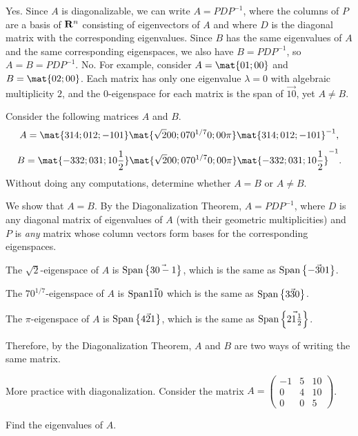 \begin{problems}
\begin{solution}
  \begin{subproblems}
    \subproblem Yes.  Since $A$ is diagonalizable, we can write
    $A = PDP^{-1}$, where the columns of $P$ are a basis of
    ${\bf R}^n$ consisting of eigenvectors of $A$ and where $D$ is the
    diagonal matrix with the corresponding eigenvalues.  Since $B$ has
    the same eigenvalues of $A$ and the same corresponding
    eigenspaces, we also have $B = PDP^{-1}$, so $A = B = PDP^{-1}$.
    \subproblem No.  For example, consider $A= \mat{0 1; 0 0}$ and
    $B = \mat{0 2; 0 0}$.  Each matrix has only one eigenvalue
    $\lambda = 0$ with algebraic multiplicity $2$, and the
    $0$-eigenspace for each matrix is the span of $\vec{1 0}$, yet
    $A \neq B$.
  \end{subproblems}
\end{solution}


\problem Consider the following matrices $A$ and $B$.
\[A = \mat{3 1 4; 0 1 2; -1 0 1} \mat{\sqrt{2} 0 0; 0 70^{1/7} 0; 0 0
    \pi} \mat{3 1 4; 0 1 2; -1 0 1}^{-1},\]
\[B = \mat{-3 3 2; 0 3 1; 1 0 \frac{1}{2}} \mat{\sqrt{2} 0 0; 0
    70^{1/7} 0; 0 0 \pi} \mat{-3 3 2; 0 3 1; 1 0 \frac{1}{2}}^{-1}.\]
Without doing any computations, determine whether $A = B$ or
$A \neq B$.

\begin{solution}
  We show that $A=B$.  By the Diagonalization Theorem, $A = PDP^{-1}$,
  where $D$ is any diagonal matrix of eigenvalues of $A$ (with their
  geometric multiplicities) and $P$ is \textit{any} matrix whose
  column vectors form bases for the corresponding eigenspaces.

  The $\sqrt{2}$-eigenspace of $A$ is
  $\textup{Span}\left\{\vec{3 0 -1}\right\}$, which is the same as
  $\textup{Span}\left\{\vec{-3 0 1}\right\}$.

  The $70^{1/7}$-eigenspace of $A$ is $\textup{Span}\vec{1 1 0}$ which
  is the same as $\textup{Span}\left\{\vec{3 3 0} \right\}$.

  The $\pi$-eigenspace of $A$ is
  $\textup{Span}\left\{\vec{4 2 1}\right\}$, which is the same as
  $\textup{Span}\left\{\vec{2 1 \frac{1}{2}}\right\}$.

  Therefore, by the Diagonalization Theorem, $A$ and $B$ are two ways
  of writing the same matrix.
\end{solution}

\problem More practice with diagonalization.  \newline \newline %
Consider the matrix
$A = \begin{pmatrix}-1& 5& 10 \\ 0& 4& 10 \\0 & 0 & 5 \end{pmatrix}$.
\begin{subproblems}
  \subproblem Find the eigenvalues of $A$.


\end{subproblems}
\end{problems}
